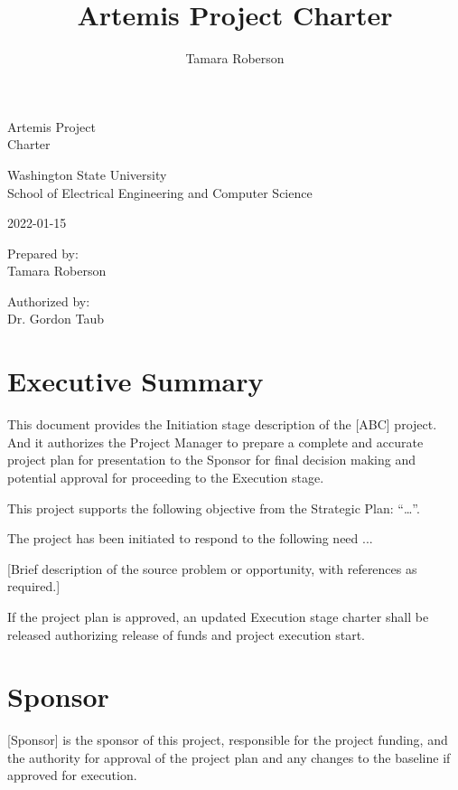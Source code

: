 \documentclass[11pt,letterpaper]{article}
\begin{document}
\title{Artemis Project Charter}
\author{Tamara Roberson}

\begin{center}
    \vspace*{5cm}

    {\Huge Artemis Project \\
        Charter}

    \vspace*{1cm}

    Washington State University \\
    School of Electrical Engineering and Computer Science

    \vspace*{1cm}

    2022-01-15

    \vspace*{1cm}

    Prepared by: \\
    Tamara Roberson
    \vspace*{1cm}

    Authorized by: \\
    Dr. Gordon Taub
\end{center}
\clearpage

\tableofcontents

\clearpage

\section{Executive Summary}
This document provides the Initiation stage description of the [ABC] project.  And it authorizes the Project Manager to prepare a complete and accurate project plan for presentation to the Sponsor for final decision making and potential approval for proceeding to the Execution stage.

This project supports the following objective from the Strategic Plan: “…”.

The project has been initiated to respond to the following need ...

    [Brief description of the source problem or opportunity, with references as required.]

If the project plan is approved, an updated Execution stage charter shall be released authorizing release of funds and project execution start.

\section{Sponsor}
 [Sponsor] is the sponsor of this project, responsible for the project funding, and the authority for approval of the project plan and any changes to the baseline if approved for execution.
\end{document}
